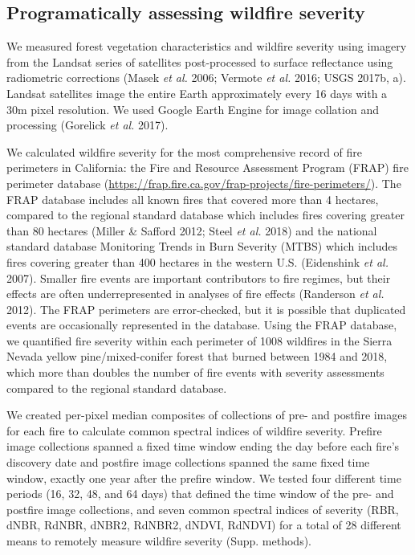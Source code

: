 \documentclass[]{article}
\begin{document}
\hypertarget{programatically-assessing-wildfire-severity}{%
\subsection{Programatically assessing wildfire
severity}\label{programatically-assessing-wildfire-severity}}

We measured forest vegetation characteristics and wildfire severity
using imagery from the Landsat series of satellites post-processed to
surface reflectance using radiometric corrections (Masek \emph{et al.}
2006; Vermote \emph{et al.} 2016; USGS 2017b, a). Landsat satellites
image the entire Earth approximately every 16 days with a 30m pixel
resolution. We used Google Earth Engine for image collation and
processing (Gorelick \emph{et al.} 2017).

We calculated wildfire severity for the most comprehensive record of
fire perimeters in California: the Fire and Resource Assessment Program
(FRAP) fire perimeter database
(\url{https://frap.fire.ca.gov/frap-projects/fire-perimeters/}). The
FRAP database includes all known fires that covered more than 4
hectares, compared to the regional standard database which includes
fires covering greater than 80 hectares (Miller \& Safford 2012; Steel
\emph{et al.} 2018) and the national standard database Monitoring Trends
in Burn Severity (MTBS) which includes fires covering greater than 400
hectares in the western U.S. (Eidenshink \emph{et al.} 2007). Smaller
fire events are important contributors to fire regimes, but their
effects are often underrepresented in analyses of fire effects
(Randerson \emph{et al.} 2012). The FRAP perimeters are error-checked,
but it is possible that duplicated events are occasionally represented
in the database. Using the FRAP database, we quantified fire severity
within each perimeter of 1008 wildfires in the Sierra Nevada yellow
pine/mixed-conifer forest that burned between 1984 and 2018, which more
than doubles the number of fire events with severity assessments
compared to the regional standard database.

We created per-pixel median composites of collections of pre- and
postfire images for each fire to calculate common spectral indices of
wildfire severity. Prefire image collections spanned a fixed time window
ending the day before each fire's discovery date and postfire image
collections spanned the same fixed time window, exactly one year after
the prefire window. We tested four different time periods (16, 32, 48,
and 64 days) that defined the time window of the pre- and postfire image
collections, and seven common spectral indices of severity (RBR, dNBR,
RdNBR, dNBR2, RdNBR2, dNDVI, RdNDVI) for a total of 28 different means
to remotely measure wildfire severity (Supp. methods).
\end{document}

